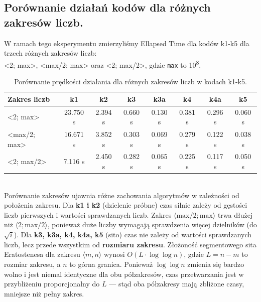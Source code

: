 \documentclass[10pt]{article}
\begin{document}
\subsection*{Porównanie działań kodów dla różnych zakresów liczb.}
W ramach tego eksperymentu zmierzyliśmy Ellapsed Time dla kodów k1-k5 dla trzech
różnych zakresów liczb: \\<2; max>, <max/2; max> oraz <2; max/2>, gdzie \texttt{max} to 10\textsuperscript{8}.
\begin{table}[h!]
\centering
\begingroup
\begin{tabular}{|l|c|c|c|c|c|c|c|}
\hline
\textbf{Zakres liczb} & \textbf{k1} & \textbf{k2} & \textbf{k3} & \textbf{k3a} & \textbf{k4} & \textbf{k4a} & \textbf{k5} \\
\hline
<2; max> & 23.750 s & 2.394 s & 0.660 s & 0.130 s & 0.381 s & 0.296 s & 0.060 s \\
\hline
<max/2; max> & 16.671 s & 3.852 s & 0.303 s & 0.069 s & 0.279 s & 0.122 s & 0.038 s \\
\hline
<2; max/2> & 7.116 s & 2.450 s & 0.282 s & 0.065 s & 0.225 s & 0.117 s & 0.050 s \\
\hline


\end{tabular}%
\endgroup
\caption{Porównanie prędkości działania dla różnych zakresów liczb w kodach k1-k5.}
\end{table}
\\
Porównanie zakresów  ujawnia różne zachowania algorytmów w zależności od położenia zakresu.
Dla \textbf{k1 i k2} (dzielenie próbne) czas silnie zależy od gęstości liczb pierwszych 
i wartości sprawdzanych liczb. Zakres $\langle \text{max}/2; \text{max} \rangle$ trwa 
dłużej niż $\langle 2; \text{max}/2 \rangle$, ponieważ 
duże liczby wymagają sprawdzenia więcej dzielników (do $\sqrt{i}$).
Dla \textbf{k3, k3a, k4, k4a, k5} (sito) czas nie zależy od wartości sprawdzanych 
liczb, lecz przede wszystkim od \textbf{rozmiaru zakresu}. Złożoność segmentowego sita 
Eratostenesa dla zakresu $\langle m, n \rangle$ wynosi $O(L \cdot \log \log n)$, 
gdzie $L = n - m$ to rozmiar zakresu, a $n$ to górna granica. Ponieważ $\log \log n$ 
zmienia się bardzo wolno i jest niemal identyczne dla obu półzakresów, czas przetwarzania jest w przybliżeniu proporcjonalny do $L$ — 
stąd oba półzakresy mają zbliżone czasy, mniejsze niż pełny zakres.
\end{document}
